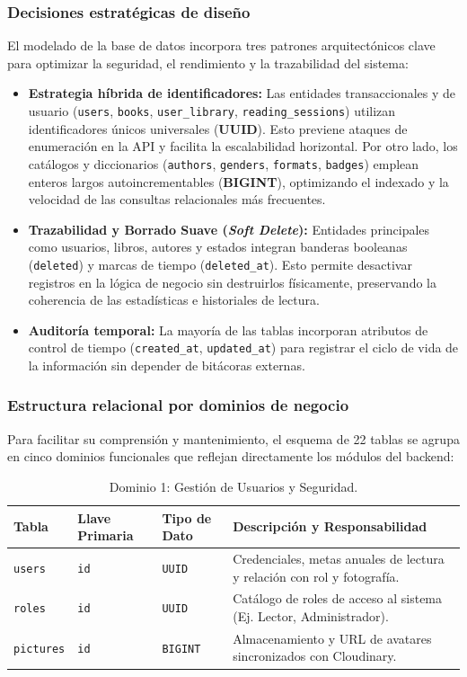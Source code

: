 \documentclass[12pt, atypical, journal]{article}
\begin{document}
\subsubsection{Decisiones estratégicas de diseño}
El modelado de la base de datos incorpora tres patrones arquitectónicos clave para optimizar la seguridad, el rendimiento y la trazabilidad del sistema:
\begin{itemize}
    \item \textbf{Estrategia híbrida de identificadores:} Las entidades transaccionales y de usuario (\texttt{users}, \texttt{books}, \texttt{user\_library}, \texttt{reading\_sessions}) utilizan identificadores únicos universales (\textbf{UUID}). Esto previene ataques de enumeración en la API y facilita la escalabilidad horizontal. Por otro lado, los catálogos y diccionarios (\texttt{authors}, \texttt{genders}, \texttt{formats}, \texttt{badges}) emplean enteros largos autoincrementables (\textbf{BIGINT}), optimizando el indexado y la velocidad de las consultas relacionales más frecuentes.
    \item \textbf{Trazabilidad y Borrado Suave (\textit{Soft Delete}):} Entidades principales como usuarios, libros, autores y estados integran banderas booleanas (\texttt{deleted}) y marcas de tiempo (\texttt{deleted\_at}). Esto permite desactivar registros en la lógica de negocio sin destruirlos físicamente, preservando la coherencia de las estadísticas e historiales de lectura.
    \item \textbf{Auditoría temporal:} La mayoría de las tablas incorporan atributos de control de tiempo (\texttt{created\_at}, \texttt{updated\_at}) para registrar el ciclo de vida de la información sin depender de bitácoras externas.
\end{itemize}

\subsubsection{Estructura relacional por dominios de negocio}
Para facilitar su comprensión y mantenimiento, el esquema de 22 tablas se agrupa en cinco dominios funcionales que reflejan directamente los módulos del backend:

\begin{table}[H]
\centering
\footnotesize
\begin{tabular}{|p{3.5cm}|p{2.3cm}|p{2cm}|p{5.5cm}|}
\hline
\textbf{Tabla} & \textbf{Llave Primaria} & \textbf{Tipo de Dato} & \textbf{Descripción y Responsabilidad} \\ \hline
\texttt{users} & \texttt{id} & \texttt{UUID} & Credenciales, metas anuales de lectura y relación con rol y fotografía. \\ \hline
\texttt{roles} & \texttt{id} & \texttt{UUID} & Catálogo de roles de acceso al sistema (Ej. Lector, Administrador). \\ \hline
\texttt{pictures} & \texttt{id} & \texttt{BIGINT} & Almacenamiento y URL de avatares sincronizados con Cloudinary. \\ \hline
\end{tabular}
\caption{Dominio 1: Gestión de Usuarios y Seguridad.}
\label{tab:db_users}
\end{table}
\end{document}
